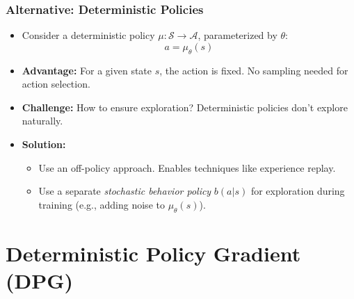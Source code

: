 \documentclass[9pt, aspectratio=169]{beamer}
\begin{document}
\begin{frame}
  \frametitle{Alternative: Deterministic Policies}
    \begin{itemize}
        \item Consider a deterministic policy $\mu: \mathcal{S} \to \mathcal{A}$, parameterized by $\theta$:
        \begin{equation*}
        a = \mu_\theta(s)
        \end{equation*}
        \item \textbf{Advantage:} For a given state $s$, the action is fixed. No sampling needed for action selection.
        \item \textbf{Challenge:} How to ensure exploration? Deterministic policies don't explore naturally.
        \item \textbf{Solution:}
          \begin{itemize}
              \item Use an off-policy approach. Enables techniques like experience replay.
              \item Use a separate \textit{stochastic behavior policy} $b(a|s)$ for exploration during training (e.g., adding noise to $\mu_\theta(s)$).
          \end{itemize}
    \end{itemize}
\end{frame}


\section{Deterministic Policy Gradient (DPG)}
\end{document}

